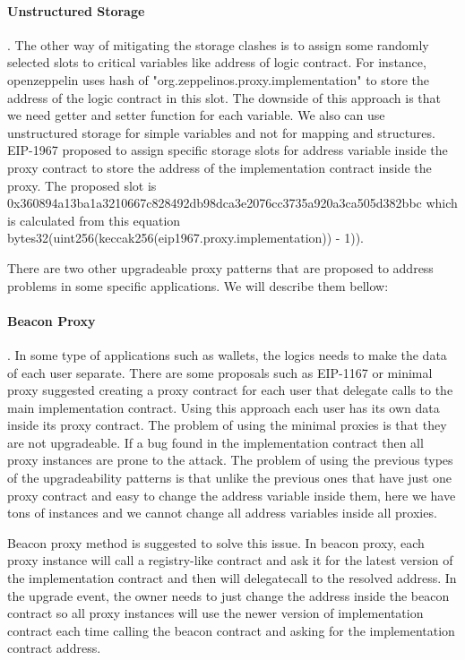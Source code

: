 \paragraph{Unstructured Storage}. 
The other way of mitigating the storage clashes is to assign some randomly selected slots to critical variables like address of logic contract. For instance, openzeppelin uses hash of "org.zeppelinos.proxy.implementation" to store the address of the logic contract in this slot.
The downside of this approach is that we need getter and setter function for each variable. We also can use unstructured storage for simple variables and not for mapping and structures. EIP-1967 proposed to assign specific storage slots for address variable inside the proxy contract to store the address of the implementation contract inside the proxy. The proposed slot is 0x360894a13ba1a3210667c828492db98dca3e2076cc3735a920a3ca505d382bbc which is calculated from this equation
bytes32(uint256(keccak256(eip1967.proxy.implementation)) - 1)). 

There are two other upgradeable proxy patterns that are proposed to address problems in some specific applications. We will describe them bellow: 

\paragraph{Beacon Proxy}. 
In some type of applications such as wallets, the logics needs to make the data of each user separate. There are some proposals such as EIP-1167 or minimal proxy suggested creating a proxy contract for each user that delegate calls to the main implementation contract. Using this approach each user has its own data inside its proxy contract. The problem of using the minimal proxies is that they are not upgradeable. If a bug found in the implementation contract then all proxy instances are prone to the attack. The problem of using the previous types of the upgradeability patterns is that unlike the previous ones that have just one proxy contract and easy to change the address variable inside them, here we have tons of instances and we cannot change all address variables inside all proxies. 

Beacon proxy method is suggested to solve this issue. In beacon proxy, each proxy instance will call a registry-like contract and ask it for the latest version of the implementation contract and then will delegatecall to the resolved address. In the upgrade event, the owner needs to just change the address inside the beacon contract so all proxy instances will use the newer version of implementation contract each time calling the beacon contract and asking for the implementation contract address.

